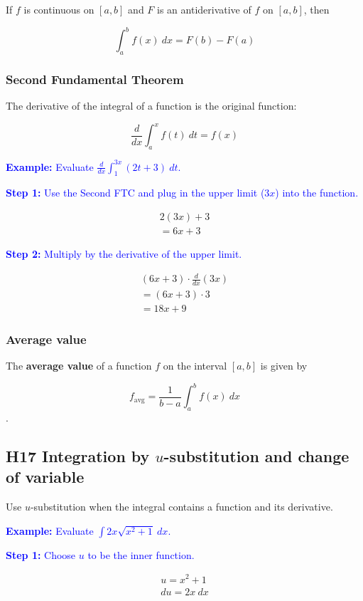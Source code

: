 \documentclass[letterpaper, 12pt]{article}
\newcommand{\example}[1]{\textcolor{blue}{\textbf{Example:} #1}}
\newcommand{\step}[2]{\textcolor{blue}{\textbf{Step #1:} #2}}
\begin{document}
If $f$ is continuous on $[a, b]$ and $F$ is an antiderivative of $f$ on $[a, b]$, then

$$\int_{a}^{b} f(x) \: dx = F(b) - F(a)$$

\subsubsection*{Second Fundamental Theorem}

The derivative of the integral of a function is the original function:

$$\frac{d}{dx} \int_{a}^{x} f(t) \: dt = f(x)$$

\example{Evaluate $\displaystyle \frac{d}{dx} \int_{1}^{3x} (2t + 3) \: dt$.}

\step{1}{Use the Second FTC and plug in the upper limit ($3x$) into the function.}

\begin{gather*}
2(3x)+3 \\
= 6x + 3
\end{gather*}

\step{2}{Multiply by the derivative of the upper limit.}

\begin{gather*}
(6x + 3) \cdot \frac{d}{dx}(3x) \\
= (6x + 3) \cdot 3 \\
= \boxed{18x + 9}
\end{gather*}

\subsubsection*{Average value}

The \textbf{average value} of a function $f$ on the interval $[a, b]$ is given by

$$f_{\text{avg}} = \frac{1}{b - a} \int_{a}^{b} f(x) \: dx$$.

\subsection*{H17 Integration by $u$-substitution and change of variable}

Use $u$-substitution when the integral contains a function and its derivative.

\example{Evaluate $\displaystyle \int 2x \sqrt{x^2 + 1} \: dx$.}

\step{1}{Choose $u$ to be the inner function.}

\begin{gather*}
u = x^2 + 1 \\
du = 2x \: dx
\end{gather*}
\end{document}
